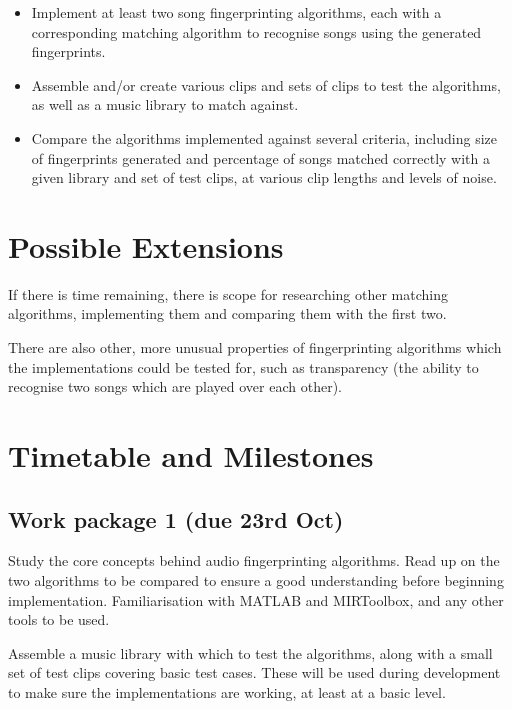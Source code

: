 \documentclass[12pt]{article}
\begin{document}
\begin{itemize}

\item Implement at least two song fingerprinting algorithms, each with a corresponding matching algorithm to recognise songs using the generated fingerprints.

\item Assemble and/or create various clips and sets of clips to test the algorithms, as well as a music library to match against.

\item Compare the algorithms implemented against several criteria, including size of fingerprints generated and percentage of songs matched correctly with a given library and set of test clips, at various clip lengths and levels of noise.

\end{itemize}


\section*{Possible Extensions}

If there is time remaining, there is scope for researching other matching algorithms, implementing them and comparing them with the first two.

There are also other, more unusual properties of fingerprinting algorithms which the implementations could be tested for, such as transparency (the ability to recognise two songs which are played over each other).

\newpage %

\section*{Timetable and Milestones}

\subsection*{Work package 1 (due 23rd Oct)}
Study the core concepts behind audio fingerprinting algorithms. Read up on the two algorithms to be compared to ensure a good understanding before beginning implementation. Familiarisation with MATLAB and MIRToolbox, and any other tools to be used.

Assemble a music library with which to test the algorithms, along with a small set of test clips covering basic test cases. These will be used during development to make sure the implementations are working, at least at a basic level.
\end{document}
